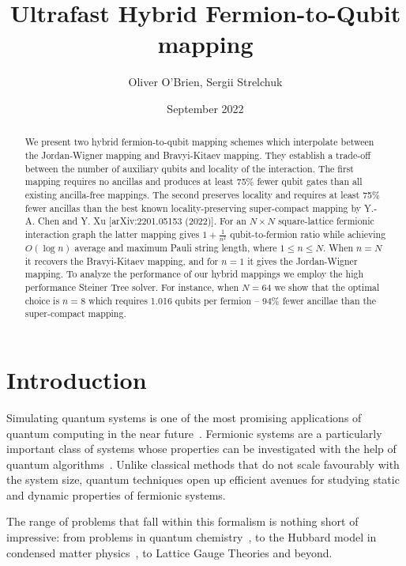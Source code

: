 \documentclass[pdftex,pra,aps,twocolumn,twoside]{revtex4-1}
\theoremstyle{plain}
\theoremstyle{note}
\newcommand\+{{\footnotesize \raisebox{0.3ex}{+}}}
\begin{document}
\title{Ultrafast Hybrid Fermion-to-Qubit mapping}
\author{Oliver O'Brien, Sergii Strelchuk}
\date{September 2022}
\begin{abstract}


We present two  hybrid fermion-to-qubit mapping schemes which interpolate between the Jordan-Wigner mapping and Bravyi-Kitaev mapping.  
They establish a trade-off between the number of auxiliary qubits and locality of the interaction. The first mapping requires no ancillas and produces at least 75\% fewer qubit gates than all existing ancilla-free mappings. The second preserves locality and requires at least 75\% fewer ancillas than the best known locality-preserving super-compact mapping by Y.-A. Chen and Y. Xu [arXiv:2201.05153 (2022)].
For an $N\times N$ square-lattice fermionic interaction graph the latter mapping gives $1+\frac{1}{n^2}$ qubit-to-fermion ratio while achieving $O(\log n)$ average and maximum Pauli string length, where $1\le n \le N$. When $n=N$ it recovers the Bravyi-Kitaev mapping, and for $n=1$ it gives the Jordan-Wigner mapping. 
To analyze the performance of our hybrid mappings we employ the high performance Steiner Tree solver. For instance, when $N=64$ we show that the optimal choice is $n=8$ which requires 1.016 qubits per fermion – 94\% fewer ancillae than the super-compact mapping.

\end{abstract}
\maketitle

\section{Introduction}
Simulating quantum systems is one of the most promising applications of quantum computing in the near future~\cite{feynman2018simulating,lloyd1996universal,ortiz2002simulating}. Fermionic systems are a particularly important class of systems whose properties can be investigated with the help of quantum algorithms~\cite{bravyi2002fermionic,friesner2005ab,ortiz2001quantum}. Unlike classical methods that do not scale favourably with the system size, quantum techniques open up efficient avenues for studying static and dynamic properties of fermionic systems.  

The range of problems that fall within this formalism is nothing short of impressive: from problems in quantum chemistry~\cite{mcardle2020quantum,reiher2017elucidating}, to the Hubbard model in condensed matter physics~\cite{abrams1997simulation}, to Lattice Gauge Theories \cite{banuls2020simulating,chakraborty2022classically} and beyond.
\end{document}
